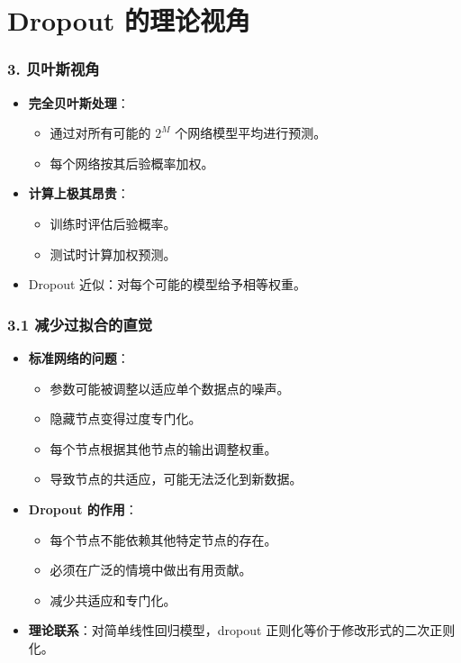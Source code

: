 \documentclass[t,aspectratio=169]{beamer} %
\begin{document}
\section{Dropout 的理论视角}

\begin{frame}
    \frametitle{3. 贝叶斯视角}
    \begin{itemize}
        \item \textbf{完全贝叶斯处理}：
        \begin{itemize}
            \item 通过对所有可能的 $2^M$ 个网络模型平均进行预测。
            \item 每个网络按其\alert{后验概率}加权。
        \end{itemize}
        \item \textbf{计算上极其昂贵}：
        \begin{itemize}
            \item 训练时评估后验概率。
            \item 测试时计算加权预测。
        \end{itemize}
        \item \alert{Dropout 近似}：对每个可能的模型给予\alert{相等权重}。
    \end{itemize}
\end{frame}

\begin{frame}
    \frametitle{3.1 减少过拟合的直觉}
    \begin{itemize}
        \item \textbf{标准网络的问题}：
        \begin{itemize}
            \item 参数可能被调整以适应单个数据点的\alert{噪声}。
            \item 隐藏节点变得\alert{过度专门化}。
            \item 每个节点根据其他节点的输出调整权重。
            \item 导致节点的\alert{共适应}，可能无法泛化到新数据。
        \end{itemize}
        \item \textbf{Dropout 的作用}：
        \begin{itemize}
            \item 每个节点\alert{不能依赖}其他特定节点的存在。
            \item 必须在\alert{广泛的情境}中做出有用贡献。
            \item 减少\alert{共适应}和专门化。
        \end{itemize}
        \item \textbf{理论联系}：对简单线性回归模型，dropout 正则化等价于\alert{修改形式的二次正则化}。
    \end{itemize}
\end{frame}
\end{document}
